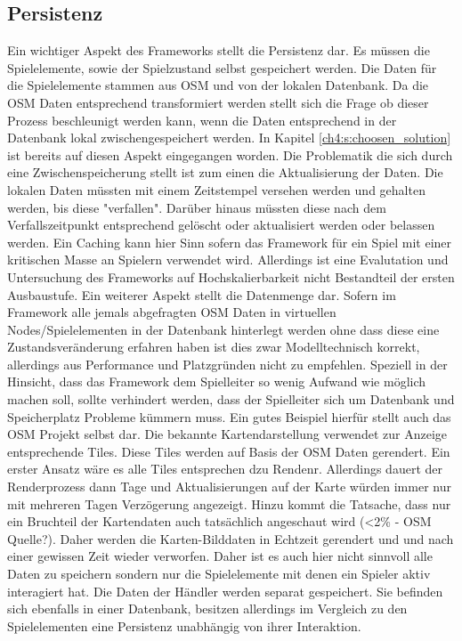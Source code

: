 \subsection*{Persistenz}

Ein wichtiger Aspekt des Frameworks stellt die Persistenz dar. Es müssen die Spielelemente, sowie der Spielzustand selbst gespeichert werden. Die Daten für die Spielelemente stammen aus OSM und von der lokalen Datenbank. Da die OSM Daten entsprechend transformiert werden stellt sich die Frage ob dieser Prozess beschleunigt werden kann, wenn die Daten entsprechend in der Datenbank lokal zwischengespeichert werden.
In Kapitel \ref{ch4:s:choosen_solution} ist bereits auf diesen Aspekt eingegangen worden. Die Problematik die sich durch eine Zwischenspeicherung stellt ist zum einen die Aktualisierung der Daten. Die lokalen Daten müssten mit einem Zeitstempel versehen werden und gehalten werden, bis diese "verfallen". Darüber hinaus müssten diese nach dem Verfallszeitpunkt entsprechend gelöscht oder aktualisiert werden oder belassen werden. Ein Caching kann hier Sinn sofern das Framework für ein Spiel mit einer kritischen Masse an Spielern verwendet wird. Allerdings ist eine Evalutation und Untersuchung des Frameworks auf Hochskalierbarkeit nicht Bestandteil der ersten Ausbaustufe. Ein weiterer Aspekt stellt die Datenmenge dar. Sofern im Framework alle jemals abgefragten OSM Daten in virtuellen Nodes/Spielelementen in der Datenbank hinterlegt werden ohne dass diese eine Zustandsveränderung erfahren haben ist dies zwar Modelltechnisch korrekt, allerdings aus Performance und Platzgründen nicht zu empfehlen. Speziell in der Hinsicht, dass das Framework dem Spielleiter so wenig Aufwand wie möglich machen soll, sollte verhindert werden, dass der Spielleiter sich um Datenbank und Speicherplatz Probleme kümmern muss. Ein gutes Beispiel hierfür stellt auch das OSM Projekt selbst dar. Die bekannte Kartendarstellung verwendet zur Anzeige entsprechende Tiles. Diese Tiles werden auf Basis der OSM Daten gerendert. Ein erster Ansatz wäre es alle Tiles entsprechen dzu Rendenr. Allerdings dauert der Renderprozess dann Tage und Aktualisierungen auf der Karte würden immer nur mit mehreren Tagen Verzögerung angezeigt. Hinzu kommt die Tatsache, dass nur ein Bruchteil der Kartendaten auch tatsächlich angeschaut wird (<2\% - OSM Quelle?). Daher werden die Karten-Bilddaten in Echtzeit gerendert und und nach einer gewissen Zeit wieder verworfen.
Daher ist es auch hier nicht sinnvoll alle Daten zu speichern sondern nur die Spielelemente mit denen ein Spieler aktiv interagiert hat.
Die Daten der Händler werden separat gespeichert. Sie befinden sich ebenfalls in einer Datenbank, besitzen allerdings im Vergleich zu den Spielelementen eine Persistenz unabhängig von ihrer Interaktion.


